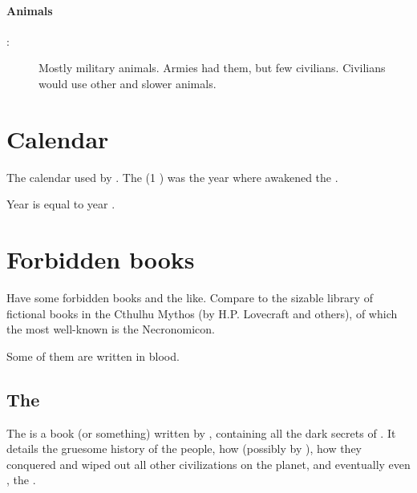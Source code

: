 \paragraph{Animals}
\begin{description}
 \item[:] 
    Mostly military animals.
    Armies had them, but few civilians. 
    Civilians would use other and slower animals.
\end{description}


















\section{\Draconian Calendar}
The calendar used by \dragons. 
The  (1 \DS) was the year where \Tiamat{} awakened the \xss. 

Year  is equal to year . 















\section{Forbidden books}
Have some forbidden books and the like. Compare to the sizable library of fictional books in the Cthulhu Mythos (by H.P. Lovecraft and others), of which the most well-known is the Necronomicon. 

Some of them are written in blood.









\subsection[The Bath Shem Torradj]{The \BathShemTorradjErebossha}
The \BathShemTorradjErebossha{} is 
a book (or something) written by , containing all the dark secrets of . It details the gruesome history of the  people, how  (possibly by ), how they conquered \Erebos{} and wiped out all other civilizations on the planet, and eventually even , the \voyagers.

